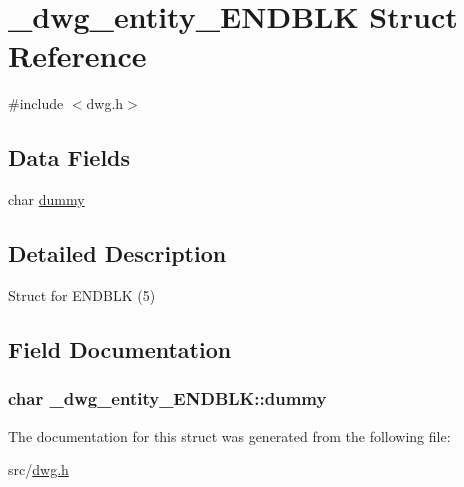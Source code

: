\hypertarget{struct__dwg__entity__ENDBLK}{\section{\-\_\-dwg\-\_\-entity\-\_\-\-E\-N\-D\-B\-L\-K \-Struct \-Reference}
\label{struct__dwg__entity__ENDBLK}
}


{\ttfamily \#include $<$dwg.\-h$>$}

\subsection*{\-Data \-Fields}
\begin{DoxyCompactItemize}
\item 
char \hyperlink{struct__dwg__entity__ENDBLK_a7431867c5ddf78e605adc71e89090f7a}{dummy}
\end{DoxyCompactItemize}


\subsection{\-Detailed \-Description}
\-Struct for \-E\-N\-D\-B\-L\-K (5) 

\subsection{\-Field \-Documentation}
\hypertarget{struct__dwg__entity__ENDBLK_a7431867c5ddf78e605adc71e89090f7a}{
\subsubsection[{dummy}]{\setlength{\rightskip}{0pt plus 5cm}char {\bf \-\_\-dwg\-\_\-entity\-\_\-\-E\-N\-D\-B\-L\-K\-::dummy}}}\label{struct__dwg__entity__ENDBLK_a7431867c5ddf78e605adc71e89090f7a}


\-The documentation for this struct was generated from the following file\-:\begin{DoxyCompactItemize}
\item 
src/\hyperlink{dwg_8h}{dwg.\-h}\end{DoxyCompactItemize}
